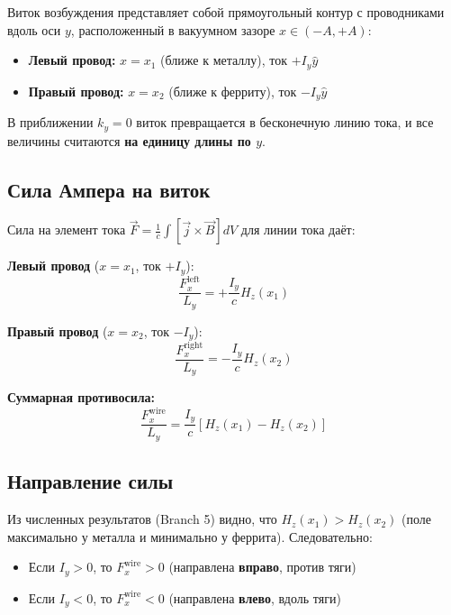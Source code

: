 \documentclass[a4paper,12pt]{article}
\begin{document}
Виток возбуждения представляет собой прямоугольный контур с проводниками
вдоль оси $y$, расположенный в вакуумном зазоре $x \in (-A, +A)$:

\begin{itemize}
    \item \textbf{Левый провод:} $x = x_1$ (ближе к металлу), ток $+I_y \hat{y}$
    \item \textbf{Правый провод:} $x = x_2$ (ближе к ферриту), ток $-I_y \hat{y}$
\end{itemize}

В приближении $k_y = 0$ виток превращается в бесконечную линию тока, и все
величины считаются \textbf{на единицу длины по $y$}.

\subsection{Сила Ампера на виток}

Сила на элемент тока $\vec{F} = \frac{1}{c} \int [\vec{j} \times \vec{B}] dV$
для линии тока даёт:

\textbf{Левый провод} ($x = x_1$, ток $+I_y$):
\begin{equation}
\frac{F_x^{\text{left}}}{L_y} = +\frac{I_y}{c} H_z(x_1)
\label{eq:wire_left}
\end{equation}

\textbf{Правый провод} ($x = x_2$, ток $-I_y$):
\begin{equation}
\frac{F_x^{\text{right}}}{L_y} = -\frac{I_y}{c} H_z(x_2)
\label{eq:wire_right}
\end{equation}

\textbf{Суммарная противосила:}
\begin{equation}
\boxed{
\frac{F_x^{\text{wire}}}{L_y} = \frac{I_y}{c} \left[ H_z(x_1) - H_z(x_2) \right]
}
\label{eq:wire_force}
\end{equation}

\subsection{Направление силы}

Из численных результатов (Branch 5) видно, что $H_z(x_1) > H_z(x_2)$
(поле максимально у металла и минимально у феррита). Следовательно:

\begin{itemize}
    \item Если $I_y > 0$, то $F_x^{\text{wire}} > 0$ (направлена \textbf{вправо},
    против тяги)
    \item Если $I_y < 0$, то $F_x^{\text{wire}} < 0$ (направлена \textbf{влево},
    вдоль тяги)
\end{itemize}
\end{document}
